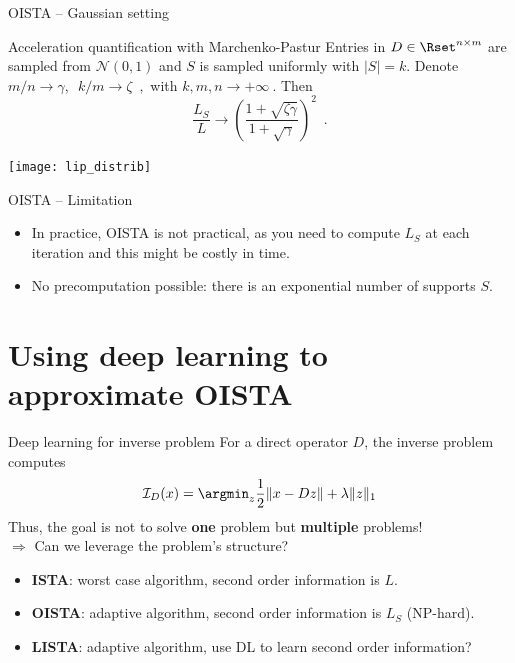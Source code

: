 \documentclass{beamer}
\begin{document}
\begin{frame}{OISTA -- Gaussian setting}
    \begin{block}{Acceleration quantification with Marchenko-Pastur}
        Entries in $D \in \Rset^{n \times m}$ are sampled from $\mathcal N(0, 1)$ and $S$ is sampled uniformly with $|S| = k$.
        Denote $m/n \rightarrow \gamma, \enspace k /m \rightarrow \zeta \enspace ,$ with $k, m, n \rightarrow +\infty~.$ Then
        \begin{equation}
        \label{eq:ratioL}
        \frac{L_S}{L} \rightarrow \left(\frac{1 + \sqrt{\zeta\gamma}}{1 + \sqrt{\gamma}} \right)^2 \enspace.
        \end{equation}
    \end{block}
    {\centering\texttt{[image: lip\_distrib]}\\}

\end{frame}

\begin{frame}{OISTA -- Limitation}
    
\begin{itemize}
    \item In practice, OISTA is not practical, as you need to compute $L_S$ at each iteration and this might be costly in time.
    \item No precomputation possible: there is an exponential number of supports $S$.
\end{itemize}

\end{frame}


\section{Using deep learning to approximate OISTA}
\parttitleframe{}

\begin{frame}[t]{Deep learning for inverse problem}
    For a direct operator $D$, the inverse problem computes
    \[
        \mathcal I_D(x) = \argmin_z \frac{1}{2}\|x - Dz\| + \lambda\|z\|_1
    \]
    Thus, the goal is not to solve {\bf one} problem but {\bf multiple} problems!\\[2em]
{\centering \large{\Large $\Rightarrow$} Can we leverage the problem's structure?\\[2em]}
\begin{itemize}\itemsep1em
    \item {\bf ISTA}: worst case algorithm, second order information is $L$.
    \item {\bf OISTA}: adaptive algorithm, second order information is $L_S$ (NP-hard).
    \item {\bf LISTA}: adaptive algorithm, use DL to learn second order information?
\end{itemize}
    
\end{frame}
\end{document}
